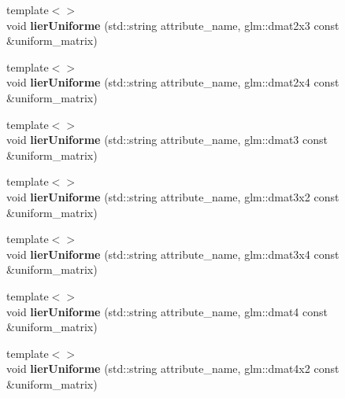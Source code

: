 \begin{DoxyCompactItemize}
\item 
\hypertarget{classopengl_1_1_programme_a3ccc5bd24bcff0b5144803ac5d3ca578}{}{\footnotesize template$<$$>$ }\\void {\bfseries lier\+Uniforme} (std\+::string attribute\+\_\+name, glm\+::dmat2x3 const \&uniform\+\_\+matrix)\label{classopengl_1_1_programme_a3ccc5bd24bcff0b5144803ac5d3ca578}

\item 
\hypertarget{classopengl_1_1_programme_ae10433ef6ec342e6b03b67354c7a2b8c}{}{\footnotesize template$<$$>$ }\\void {\bfseries lier\+Uniforme} (std\+::string attribute\+\_\+name, glm\+::dmat2x4 const \&uniform\+\_\+matrix)\label{classopengl_1_1_programme_ae10433ef6ec342e6b03b67354c7a2b8c}

\item 
\hypertarget{classopengl_1_1_programme_a53c84af502eb17f4f3683927fe679421}{}{\footnotesize template$<$$>$ }\\void {\bfseries lier\+Uniforme} (std\+::string attribute\+\_\+name, glm\+::dmat3 const \&uniform\+\_\+matrix)\label{classopengl_1_1_programme_a53c84af502eb17f4f3683927fe679421}

\item 
\hypertarget{classopengl_1_1_programme_a2ac6cee4fc61c3ef154ce06d60f95ad9}{}{\footnotesize template$<$$>$ }\\void {\bfseries lier\+Uniforme} (std\+::string attribute\+\_\+name, glm\+::dmat3x2 const \&uniform\+\_\+matrix)\label{classopengl_1_1_programme_a2ac6cee4fc61c3ef154ce06d60f95ad9}

\item 
\hypertarget{classopengl_1_1_programme_ab1d99d2800a2c39fb12c5234485e0650}{}{\footnotesize template$<$$>$ }\\void {\bfseries lier\+Uniforme} (std\+::string attribute\+\_\+name, glm\+::dmat3x4 const \&uniform\+\_\+matrix)\label{classopengl_1_1_programme_ab1d99d2800a2c39fb12c5234485e0650}

\item 
\hypertarget{classopengl_1_1_programme_a6c104e8c3bdf62532bc7d036bc3a2ab0}{}{\footnotesize template$<$$>$ }\\void {\bfseries lier\+Uniforme} (std\+::string attribute\+\_\+name, glm\+::dmat4 const \&uniform\+\_\+matrix)\label{classopengl_1_1_programme_a6c104e8c3bdf62532bc7d036bc3a2ab0}

\item 
\hypertarget{classopengl_1_1_programme_a86ee8e39f26bf744d6113b9f3e70742e}{}{\footnotesize template$<$$>$ }\\void {\bfseries lier\+Uniforme} (std\+::string attribute\+\_\+name, glm\+::dmat4x2 const \&uniform\+\_\+matrix)\label{classopengl_1_1_programme_a86ee8e39f26bf744d6113b9f3e70742e}


\end{DoxyCompactItemize}
